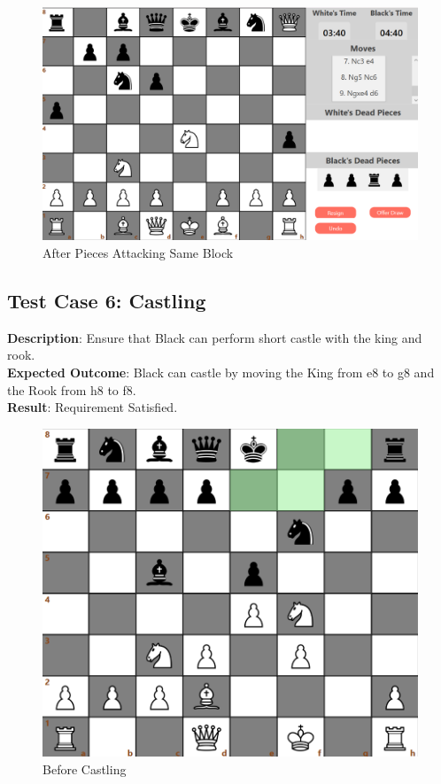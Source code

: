 \documentclass[a4paper,12pt]{article}
\begin{document}
\begin{figure}[H]
    \centering
    \includegraphics[width=0.7\linewidth]{Images/Test Cases/testCase5Part2Img2.png}
    \caption{After Pieces Attacking Same Block}
    \label{fig:AfterAttackingSameBlock}
\end{figure}

\subsection{Test Case 6: Castling}
\textbf{Description}: Ensure that Black can perform short castle with the king and rook.\\
\textbf{Expected Outcome}: Black can castle by moving the King from e8 to g8 and the Rook from h8 to f8.\\
\textbf{Result}: Requirement Satisfied.

\begin{figure}[H]
    \centering
    \includegraphics[width=0.7\linewidth]{Images/Test Cases/testCase6Img1.png}
    \caption{Before Castling}
    \label{fig:BeforeCastling}
\end{figure}
\end{document}
